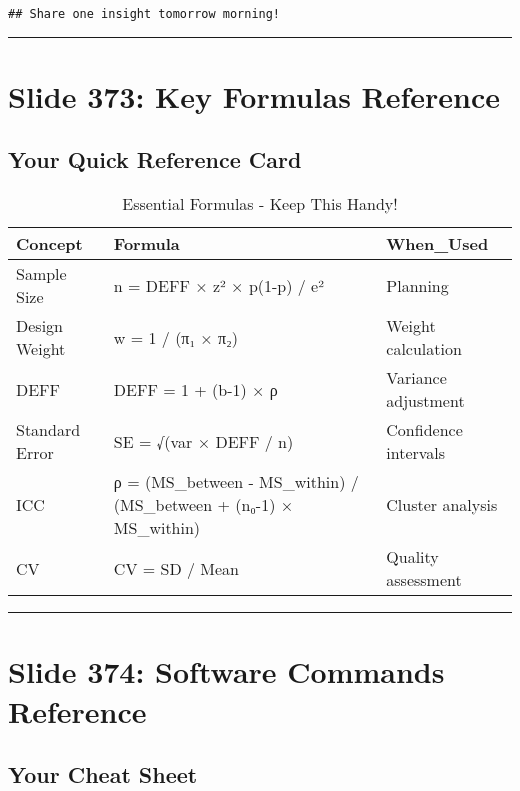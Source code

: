 \documentclass[
]{article}
\begin{document}
\begin{verbatim}
## Share one insight tomorrow morning!
\end{verbatim}

\begin{center}\rule{0.5\linewidth}{0.5pt}\end{center}

\section{Slide 373: Key Formulas
Reference}\label{slide-373-key-formulas-reference}

\subsection{Your Quick Reference Card}\label{your-quick-reference-card}

\begin{longtable}[t]{l>{}ll}
\caption{\label{tab:formulas-reference}Essential Formulas - Keep This Handy!}\\
\toprule
Concept & Formula & When\_Used\\
\midrule
Sample Size & n = DEFF × z² × p(1-p) / e² & Planning\\
Design Weight & w = 1 / (π₁ × π₂) & Weight calculation\\
DEFF & DEFF = 1 + (b-1) × ρ & Variance adjustment\\
Standard Error & SE = √(var × DEFF / n) & Confidence intervals\\
ICC & ρ = (MS\_between - MS\_within) / (MS\_between + (n₀-1) × MS\_within) & Cluster analysis\\
\addlinespace
CV & CV = SD / Mean & Quality assessment\\
\bottomrule
\end{longtable}

\begin{center}\rule{0.5\linewidth}{0.5pt}\end{center}

\section{Slide 374: Software Commands
Reference}\label{slide-374-software-commands-reference}

\subsection{Your Cheat Sheet}\label{your-cheat-sheet}
\end{document}
